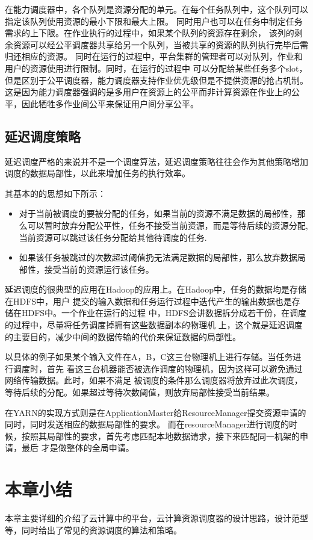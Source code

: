 在能力调度器中，各个队列是资源分配的单元。在每个任务队列中，这个队列可以指定该队列使用资源的最小下限和最大上限。
同时用户也可以在任务中制定任务需求的上下限。在作业执行的过程中，如果某个队列的资源存在剩余，
该列的剩余资源可以经公平调度器共享给另一个队列，当被共享的资源的队列执行完毕后需归还相应的资源。
同时在运行的过程中，平台集群的管理者可以对队列，作业和用户的资源使用进行限制。同时，在运行的过程中
可以分配给某些任务多个slot，但是区别于公平调度器，能力调度器支持作业优先级但是不提供资源的抢占机制。
这是因为能力调度器强调的是多用户在资源上的公平而非计算资源在作业上的公平，因此牺牲多作业间公平来保证用户间分享公平。
\subsection{延迟调度策略}
延迟调度严格的来说并不是一个调度算法，延迟调度策略\cite{ref37}往往会作为其他策略增加调度的数据局部性，以此来增加任务的执行效率。

其基本的的思想如下所示：
\begin{itemize}
\item 对于当前被调度的要被分配的任务，如果当前的资源不满足数据的局部性，那么可以暂时放弃分配公平性，任务不接受当前资源，而是等待后续的资源分配,
当前资源可以跳过该任务分配给其他待调度的任务.
\item 如果该任务被跳过的次数超过阈值扔无法满足数据的局部性，那么放弃数据局部性，接受当前的资源运行该任务。
\end{itemize}
延迟调度的很典型的应用在Hadoop的应用上。在Hadoop中，任务的数据均是存储在HDFS中，用户
提交的输入数据和任务运行过程中迭代产生的输出数据也是存储在HDFS中。一个作业在运行的过程
中，HDFS会讲数据拆分成若干份，在调度的过程中，尽量将任务调度掉拥有这些数据副本的物理机
上，这个就是延迟调度的主要目的，减少中间的数据传输的代价来保证数据的局部性。

以具体的例子如果某个输入文件在A，B，C这三台物理机上进行存储。当任务进行调度时，首先
看这三台机器能否被选作调度的物理机，因为这样可以避免通过网络传输数据。此时，如果不满足
被调度的条件那么调度器将放弃过此次调度，等待后续的分配。如果超过等待次数阈值，则放弃局部性接受当前结果。

在YARN的实现方式则是在ApplicationMaster给ResourceManager提交资源申请的同时，同时发送相应的数据局部性的要求。
而在resourceManager进行调度的时候，按照其局部性的要求，首先考虑匹配本地数据请求，接下来匹配同一机架的申请，最后
才是做整体的全局申请。

\section{本章小结}
本章主要详细的介绍了云计算中的平台，云计算资源调度器的设计思路，设计范型等，同时给出了常见的资源调度的算法和策略。
